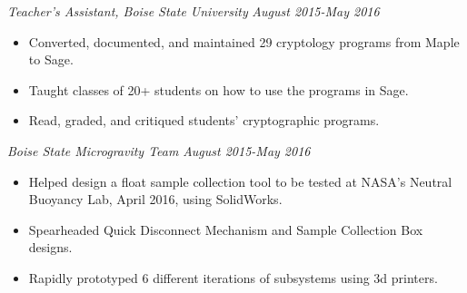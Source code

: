 \documentclass[letterpaper]{article}
\begin{document}
\vspace{.05in}
\begin{multicols}{2}
\textit{ Teacher's Assistant, Boise State University}
\vfill
\columnbreak
\textit{August 2015-May 2016}
\end{multicols}
\begin{itemize}
    \item Converted, documented, and maintained 29 cryptology programs from Maple to Sage.
    \item Taught classes of 20+ students on how to use the programs in Sage.
    \item Read, graded, and critiqued students' cryptographic programs.
\end{itemize}

\vspace{.05in}
\begin{multicols}{2}
\textit{Boise State Microgravity Team}
\vfill
\columnbreak
\textit{August 2015-May 2016}
\end{multicols}
\begin{itemize}
    \item Helped design a float sample collection tool to be tested at NASA's Neutral Buoyancy Lab, April 2016, using SolidWorks.
    \item Spearheaded Quick Disconnect Mechanism and Sample Collection Box designs. 
	\item Rapidly prototyped 6 different iterations of subsystems using 3d printers.
\end{itemize}
\end{document}
